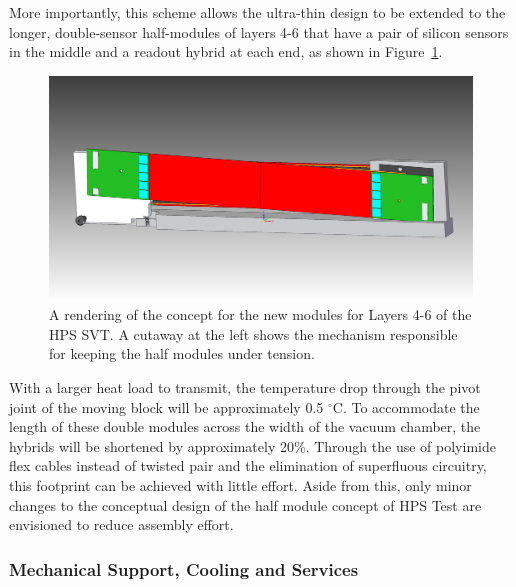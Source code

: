 More importantly, this scheme allows the ultra-thin design to be extended to the longer, double-sensor half-modules of layers 4-6 that have a pair of silicon sensors in the middle and a readout hybrid at each end, as shown in Figure~\ref{fig:newmodule_L4-6}.  
\begin{figure}[ht]
    \includegraphics[width=\textwidth]{svt/figures/10dec1}
\caption{\small{A rendering of the concept for the new modules for Layers 4-6 of the HPS SVT.  A cutaway at the left shows the mechanism responsible for keeping the half modules under tension.} }
\label{fig:newmodule_L4-6}
\end{figure}
With a larger heat load to transmit, the temperature drop through the pivot joint of the moving block will be approximately 0.5 $^\circ$C. To accommodate the length of these double modules across the width of the vacuum chamber, the hybrids will be shortened by approximately 20\%.  Through the use of polyimide flex cables instead of twisted pair and the elimination of superfluous circuitry, this footprint can be achieved with little effort.  Aside from this, only minor changes to the conceptual design of the half module concept of HPS Test are envisioned to reduce assembly effort.

\subsubsection{Mechanical Support, Cooling and Services}

